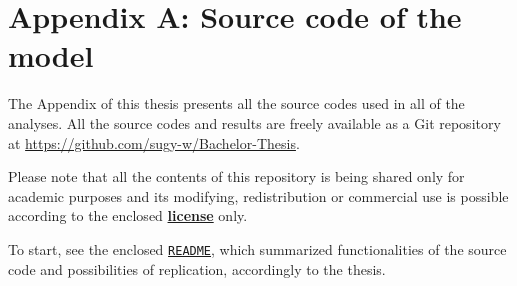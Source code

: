 \chapter*{Appendix A: Source code of the model}

The Appendix of this thesis presents all the source codes used in
all of the analyses. All the source codes and results are
freely available as a Git repository at \url{https://github.com/sugy-w/Bachelor-Thesis}.
\newline
\par
Please note that all the contents of this repository is being shared only
for academic purposes and its modifying, redistribution or commercial use is possible 
according to the enclosed \href{https://github.com/sugy-w/Bachelor-Thesis/blob/main/LICENSE.md}{\textbf{license}} only.

To start, see the enclosed \href{https://github.com/sugy-w/Bachelor-Thesis/blob/main/README.md}{\texttt{README}}, which summarized functionalities of the source code and possibilities 
of replication, accordingly to the thesis.
